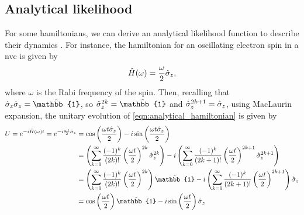 \subsection{Analytical likelihood}\label{sec:analytical_likelihood}
For some \glspl{hamiltonian}, we can derive an analytical \gls{likelihood} function to describe their dynamics
\cite{sergeevich2011characterization, ferrie2013best}.
For instance, the \gls{hamiltonian} for an oscillating electron spin in a \acrlong{nvc} 
is given by
\begin{equation}
    \label{eqn:analytical_hamiltonian}
    \hat{H}(\omega) = \frac{\omega}{2} \hat{\sigma}_z,
\end{equation}
where $\omega$ is the Rabi frequency of the spin. 
Then, recalling that $\s_z \s_z = \hat{\mathbb{1}}$, so $\s_z^{2k}=\hat{\mathbb{1}}$ and $\hat{\sigma}_z^{2k+1} = \hat{\sigma}_z$, 
using MacLaurin expansion, the unitary evolution of \cref{eqn:analytical_hamiltonian} is given by 
\begin{align}
\begin{split}
    U = e^{-i \hat{H}(\omega)t} = e^{-i \frac{\omega t}{2} \s_z}  
    &= \cos\bk{ \frac{\omega t \s_z}{2}} 
    - i \sin\bk{ \frac{\omega t \s_z}{2}} \\
    &= \bk{ \sum\limits_{k=0}^{\infty} \frac{(-1)^k}{(2k)!} \bk{ \frac{\omega t}{2} }^{2k} \s_z^{2k}  }
    - i \bk{\sum\limits_{k=0}^{\infty} \frac{(-1)^k}{(2k+1)!} \bk{ \frac{\omega t}{2} }^{2k+1} \s_z^{2k+1}} \\
    &=  \bk{\sum\limits_{k=0}^{\infty} \frac{(-1)^k}{(2k)!} \bk{ \frac{\omega t}{2} }^{2k}} \hat{\mathbb{1}} 
    - i \bk{\sum\limits_{k=0}^{\infty} \frac{(-1)^k}{(2k+1)!} \bk{ \frac{\omega t}{2} }^{2k+1} } \s_z \\
    &= \cos\bk{\frac{\omega t}{2}}\hat{\mathbb{1}} - i \sin\bk{\frac{\omega t}{2}} \s_z
\end{split}
\end{align}

